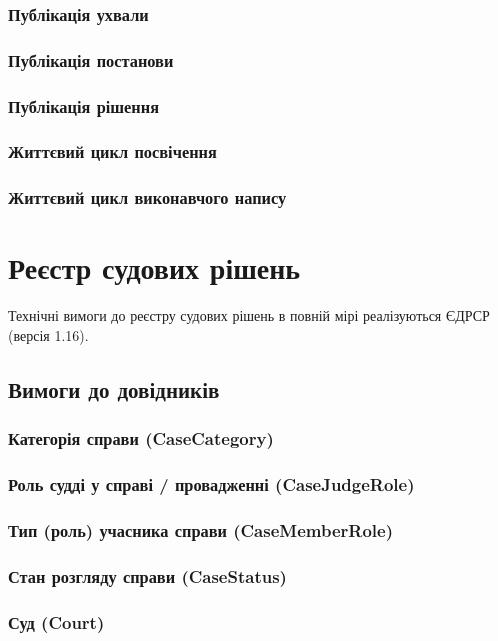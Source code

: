 \documentclass{article}
\begin{document}
\subsubsection{Публікація ухвали}
\subsubsection{Публікація постанови}
\subsubsection{Публікація рішення}
\subsubsection{Життєвий цикл посвічення}
\subsubsection{Життєвий цикл виконавчого напису}

\newpage
\section{Реєстр судових рішень}
Технічні вимоги до реєстру судових рішень в повній мірі реалізуються ЄДРСР (версія 1.16).

\subsection{Вимоги до довідників}

\subsubsection{Категорія справи (CaseCategory)}
\subsubsection{Роль судді у справі / провадженні (CaseJudgeRole)}
\subsubsection{Тип (роль) учасника справи (CaseMemberRole)}
\subsubsection{Стан розгляду справи (CaseStatus)}
\subsubsection{Суд (Court)}
\end{document}
